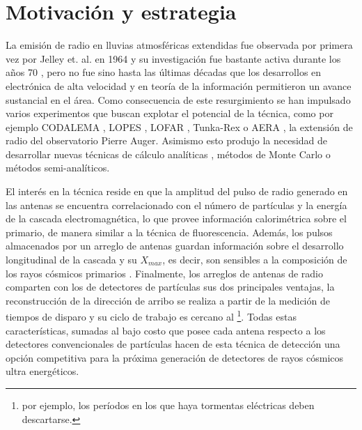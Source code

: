 \chapter{Motivaci\'on y estrategia}
\label{ch:motRadio}


La emisi\'on de radio en lluvias atmosf\'ericas extendidas fue observada por primera vez por Jelley et. al. en 1964 \cite{jelley1966radio} y su investigaci\'on fue bastante activa durante los a\~nos 70 \cite{allan1971progress}, pero no fue sino hasta las \'ultimas d\'ecadas que los desarrollos en electr\'onica de alta velocidad y en teor\'ia de la informaci\'on permitieron un avance sustancial en el \'area.
Como consecuencia de este resurgimiento se han impulsado varios experimentos que buscan explotar el potencial de la t\'ecnica, como por ejemplo CODALEMA \cite{ardouin2005radio}, LOPES \cite{huege2012lopes}, LOFAR \cite{horandel2009lofar}, Tunka-Rex \cite{schroder2013tunka} o AERA \cite{kelley2011aera}, la extensi\'on de radio del observatorio Pierre Auger.
Asimismo esto produjo la necesidad de desarrollar nuevas t\'ecnicas de c\'alculo anal\'iticas \cite{huege2003radio,scholten2008macroscopic}, m\'etodos de Monte Carlo \cite{huege2007monte,ludwig2011reas3} o m\'etodos semi-anal\'iticos\cite{scholten2009macroscopic}.

El interés en la técnica reside en que la amplitud del pulso de radio generado en las antenas se encuentra correlacionado con el número de partículas y la energía de la cascada electromagnética, lo que provee información calorimétrica sobre el primario, de manera similar a la técnica de fluorescencia.
Adem\'as, los pulsos almacenados por un arreglo de antenas guardan información sobre el desarrollo longitudinal de la cascada y su $X_{max}$, es decir, son sensibles a la composici\'on de los rayos c\'osmicos primarios \cite{cite:hauge_rec,cite:lofar_rec}.
Finalmente, los arreglos de antenas de radio comparten con los de detectores de partículas sus dos principales ventajas, la reconstrucción de la dirección de arribo se realiza a partir de la medición de tiempos de disparo y su ciclo de trabajo es cercano al \footnote{por ejemplo, los períodos en los que haya tormentas eléctricas deben descartarse.}.
Todas estas características, sumadas al bajo costo que posee cada antena respecto a los detectores convencionales de partículas hacen de esta técnica de detección una opción competitiva para la próxima generación de detectores de rayos c\'osmicos ultra energ\'eticos.

